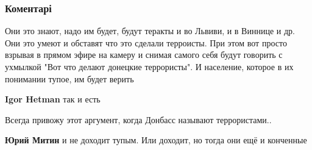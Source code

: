  
 
 
 
 
\subsubsection{Коментарі}

\begin{itemize}
 

Они это знают, надо им будет, будут теракты и во Львиви, и в Виннице и др. Они
это умеют и обставят что это сделали терроисты. При этом вот просто взрывая в
прямом эфире на камеру и снимая самого себя будут говорить с ухмылкой "Вот что
делают донецкие террористы". И население, которое в их понимании тупое, им
будет верить

\begin{itemize}
 
\textbf{Igor Hetman} так и есть
\end{itemize}

 
Всегда привожу этот аргумент, когда Донбасс называют террористами..

\begin{itemize}
 
\textbf{Юрий Митин} и не доходит тупым. Или доходит, но тогда они ещё и конченные


\end{itemize}
\end{itemize}
